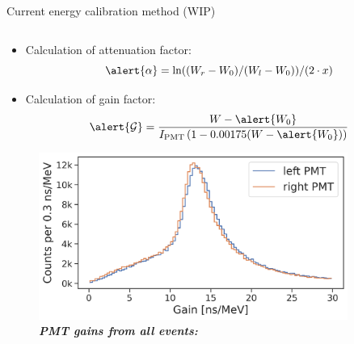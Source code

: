 \documentclass{ikpKoeln}
\begin{document}
\begin{frame}[t]{Current energy calibration method (WIP)}
\begin{columns}[c]
\begin{column}{0.45 \textwidth}
{\begin{itemize}
					\item Calculation of attenuation factor:
					      \vspace{-0.5em}
					      $$ \left. \alert{\alpha} = \ln((W_r - W_0) \middle/ (W_l - W_0)) \middle/ (2 \cdot x) \right.$$
					\item \vspace{-1em}Calculation of gain factor:
					      \vspace{-0.5em}
					      $$\alert{\mathcal{G}} = \frac{W - \alert{W_0}}{I_\text{PMT} \left(1 - 0.00175(W - \alert{W_0})\right)}$$
				\end{itemize}
			}
			\begin{figure}
				\captionsetup{singlelinecheck=off}
				\vspace{-2em}
				\caption*{\textit{\textbf{PMT gains from all events:}}}
				\vspace{-1em}
				\includegraphics[width = 0.9\textwidth]{DPG2025/EnergyGain.png}
			\end{figure}
		\end{column}
	\end{columns}
\end{frame}
\end{document}
